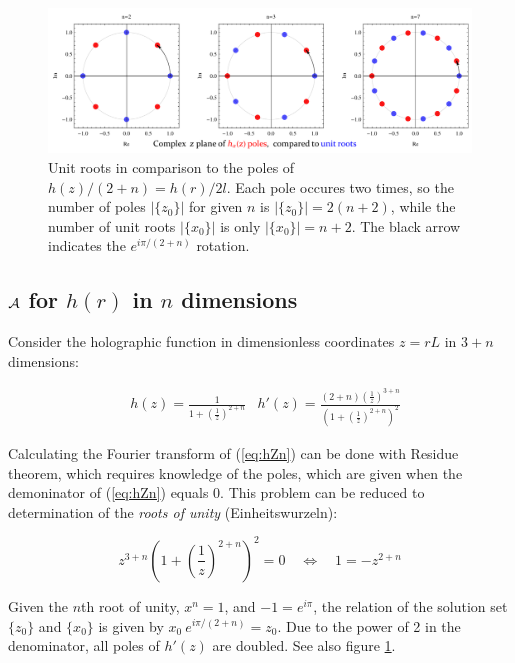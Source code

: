 \documentclass[10pt,a4paper, fleqn]{article}
\begin{document}
\begin{figure}[t]
\includegraphics[width=\textwidth]{mathematica/wurzeln.pdf}
\caption{Unit roots in comparison to the poles of $h(z)/(2+n)=h(r)/2l$. Each pole occures two times, so the number of poles $|\{z_0\}|$ for given $n$ is $|\{z_0\}| = 2(n+2)$, while the number of unit roots $|\{x_0\}|$ is only $|\{x_0\}|=n+2$. The black arrow indicates the $e^{i\pi/(2+n)}$ rotation.} \label{fig:poles}
\end{figure}


\subsection{${\cal A}$ for $h(r)$ in $n$ dimensions}

Consider the holographic function in dimensionless coordinates $z=r L$ in $3+n$ dimensions:

\begin{align}
&h(z) = \frac 1{1+\left(\frac 1z\right)^{2+n}}
&h'(z) = \frac {(2+n) \left( \frac 1z \right)^{3+n}}
{\left( 1 + \left( \frac 1z \right)^{2+n} \right)^2}
\label{eq:hZn}
\end{align}

Calculating the Fourier transform of (\ref{eq:hZn}) can be done with Residue theorem, which requires knowledge of the poles, which are given when the demoninator of (\ref{eq:hZn}) equals 0. This problem can be reduced to determination of  the {\it roots of unity} (Einheitswurzeln):

\begin{equation}
z^{3+n} \left( 1 + \left( \frac 1z \right)^{2+n}\right)^2 = 0
\quad \Leftrightarrow \quad
1 = -z^{2+n}
\end{equation}

Given the $n$th root of unity, $x^n = 1$, and $-1 = e^{i\pi}$, the relation of the solution set $\{z_0\}$ and $\{x_0\}$ is given by $x_0 ~ e^{i\pi / (2+n)} = z_0$. Due to the power of 2 in the denominator, all poles of $h'(z)$ are doubled. See also figure \ref{fig:poles}.
\end{document}
